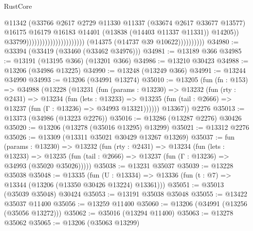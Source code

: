 \begin{lexlean}{RustCore}
\begin{coremodule}
                                                                  @11342
                                                                  (@33766
                                                                    @2617
                                                                    @2729
                                                                    @11330
                                                                    @11337
                                                                    (@33674 @2617 @33677 @13577)
                                                                    @16175
                                                                    @16179
                                                                    @16183
                                                                    @14401
                                                                    (@13838 (@14403 @11337 @11331))
                                                                    @14205))
                                                                @33799))))))))))))))))))))))
                    (@14375 (@14737 @39 @10622))))))))))
@34980 := @33394 (@33419 (@33460 (@33462 @34976)))
@34981 := @13189 @366
@34985 := @13191 (@13195 @366) (@13201 @366)
@34986 := @13210 @30423
@34988 := @13206 (@34986 @13225)
@34990 := @13248 (@13249 @366)
@34991 := @13244 @34990
@34993 := @13206 (@34991 @13274)
@35010 := @13205
    (fun (fn : @153) =>
    @34988
      (@13228
        (@13231
          (fun (params : @13230) =>
          @13232
            (fun (rty : @2431) =>
            @13234
              (fun (lets : @13233) =>
              @13235 (fun (tail : @2666) => @13237 (fun (Γ : @13236) => @34993 @13321))))))
        @13367))
    @2276
@35013 := @13373 (@34986 (@13223 @2276))
@35016 := @13286 (@13287 @2276) @30426
@35020 := @13206 (@13278 (@35016 @13295) @13299)
@35021 := @13312 @2276
@35026 := @13309 (@13311 @35021 @30429 @13267 @13269)
@35037 := fun (params : @13230) =>
  @13232
    (fun (rty : @2431) =>
    @13234
      (fun (lets : @13233) =>
      @13235 (fun (tail : @2666) => @13237 (fun (Γ : @13236) => @34993 (@35020 @35026)))))
@35038 := @13231 @35037
@35039 := @13228 @35038
@35048 := @13335
    (fun (U : @13334) => @13336 (fun (t : @7) => @13344 (@13206 (@13350 @30426 @13224) @13361)))
@35051 := @35013 (@35039 @35048) @30424
@35053 := @13191 @35038 @35048
@35055 := @13422 @35037 @11400
@35056 := @13259 @11400
@35060 := @13206 (@34991 (@13256 (@35056 @13272)))
@35062 := @35016 (@13294 @11400)
@35063 := @13278 @35062
@35065 := @13206 (@35063 @13299)

\end{coremodule}
\end{lexlean}
